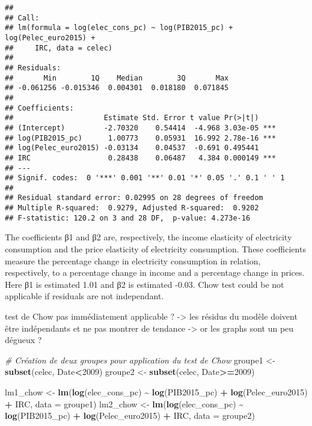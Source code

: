 \documentclass[
]{article}
\newenvironment{Shaded}{\begin{snugshade}}{\end{snugshade}}
\newcommand{\AttributeTok}[1]{\textcolor[rgb]{0.13,0.29,0.53}{#1}}
\newcommand{\CommentTok}[1]{\textcolor[rgb]{0.56,0.35,0.01}{\textit{#1}}}
\newcommand{\DecValTok}[1]{\textcolor[rgb]{0.00,0.00,0.81}{#1}}
\newcommand{\FunctionTok}[1]{\textcolor[rgb]{0.13,0.29,0.53}{\textbf{#1}}}
\newcommand{\NormalTok}[1]{#1}
\newcommand{\OtherTok}[1]{\textcolor[rgb]{0.56,0.35,0.01}{#1}}
\newcommand{\SpecialCharTok}[1]{\textcolor[rgb]{0.81,0.36,0.00}{\textbf{#1}}}
\begin{document}
\begin{verbatim}
## 
## Call:
## lm(formula = log(elec_cons_pc) ~ log(PIB2015_pc) + log(Pelec_euro2015) + 
##     IRC, data = celec)
## 
## Residuals:
##       Min        1Q    Median        3Q       Max 
## -0.061256 -0.015346  0.004301  0.018180  0.071845 
## 
## Coefficients:
##                     Estimate Std. Error t value Pr(>|t|)    
## (Intercept)         -2.70320    0.54414  -4.968 3.03e-05 ***
## log(PIB2015_pc)      1.00773    0.05931  16.992 2.78e-16 ***
## log(Pelec_euro2015) -0.03134    0.04537  -0.691 0.495441    
## IRC                  0.28438    0.06487   4.384 0.000149 ***
## ---
## Signif. codes:  0 '***' 0.001 '**' 0.01 '*' 0.05 '.' 0.1 ' ' 1
## 
## Residual standard error: 0.02995 on 28 degrees of freedom
## Multiple R-squared:  0.9279, Adjusted R-squared:  0.9202 
## F-statistic: 120.2 on 3 and 28 DF,  p-value: 4.273e-16
\end{verbatim}

The coefficients β1 and β2 are, respectively, the income elasticity of
electricity consumption and the price elasticity of electricity
consumption. These coefficients measure the percentage change in
electricity consumption in relation, respectively, to a percentage
change in income and a percentage change in prices. Here β1 is estimated
1.01 and β2 is estimated -0.03. Chow test could be not applicable if
residuals are not independant.

test de Chow pas immédiatement applicable ? -\textgreater{} les résidus
du modèle doivent être indépendants et ne pas montrer de tendance
-\textgreater{} or les graphs sont un peu dégueux ?

\begin{Shaded}
\begin{Highlighting}[]
\CommentTok{\# Création de deux groupes pour application du test de Chow}
\NormalTok{groupe1 }\OtherTok{\textless{}{-}} \FunctionTok{subset}\NormalTok{(celec, Date}\SpecialCharTok{\textless{}}\DecValTok{2009}\NormalTok{)}
\NormalTok{groupe2 }\OtherTok{\textless{}{-}} \FunctionTok{subset}\NormalTok{(celec, Date}\SpecialCharTok{\textgreater{}=}\DecValTok{2009}\NormalTok{)}
\end{Highlighting}
\end{Shaded}

\begin{Shaded}
\begin{Highlighting}[]
\NormalTok{lm1\_chow }\OtherTok{\textless{}{-}} \FunctionTok{lm}\NormalTok{(}\FunctionTok{log}\NormalTok{(elec\_cons\_pc) }\SpecialCharTok{\textasciitilde{}} \FunctionTok{log}\NormalTok{(PIB2015\_pc) }\SpecialCharTok{+} \FunctionTok{log}\NormalTok{(Pelec\_euro2015) }\SpecialCharTok{+}\NormalTok{ IRC, }\AttributeTok{data =}\NormalTok{ groupe1)}
\NormalTok{lm2\_chow }\OtherTok{\textless{}{-}} \FunctionTok{lm}\NormalTok{(}\FunctionTok{log}\NormalTok{(elec\_cons\_pc) }\SpecialCharTok{\textasciitilde{}} \FunctionTok{log}\NormalTok{(PIB2015\_pc) }\SpecialCharTok{+} \FunctionTok{log}\NormalTok{(Pelec\_euro2015) }\SpecialCharTok{+}\NormalTok{ IRC, }\AttributeTok{data =}\NormalTok{ groupe2)}
\end{Highlighting}
\end{Shaded}
\end{document}
